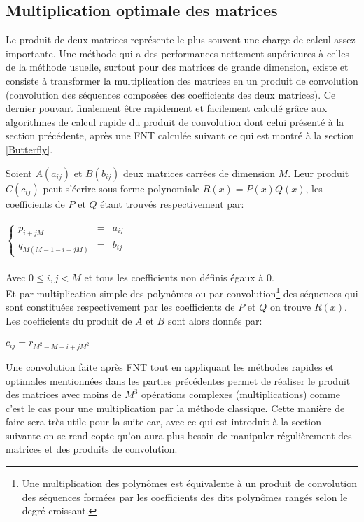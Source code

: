 \subsection{Multiplication optimale des matrices \cite{Matrices}}
Le produit de deux matrices représente le plus souvent une charge de calcul assez importante. Une méthode qui a des performances nettement supérieures à celles de la méthode usuelle, surtout pour des matrices de grande dimension, existe et consiste à transformer la multiplication des matrices en un produit de convolution (convolution des séquences composées des coefficients des deux matrices). Ce dernier pouvant finalement être rapidement et facilement calculé grâce aux algorithmes de calcul rapide du produit de convolution dont celui présenté à la section précédente, après une FNT calculée suivant ce qui est montré à la section \ref{Butterfly}.
\begin{algorithm}\label{MultiplicationMatrices}
Soient $ A(a_{ij}) $ et $ B(b_{ij}) $ deux matrices carrées de dimension $ M $. Leur produit $ C(c_{ij}) $ peut s'écrire sous forme polynomiale $ R(x) = P(x)Q(x) $, les coefficients de $ P $ et $ Q $ étant trouvés respectivement par:\\
 \\
$ \left\{\begin{array}{lcl}
p_{i+jM} &=& a_{ij}\\
q_{M(M-1-i+jM)} &=& b_{ij}
\end{array}\right. $  \\
 \\
Avec $ 0\leq i,j<M $ et tous les coefficients non définis égaux à $ 0 $.\\
Et par multiplication simple des polynômes ou par convolution\footnote{Une multiplication des polynômes est équivalente à un produit de convolution des séquences formées par les coefficients des dits polynômes rangés selon le degré croissant.} des séquences qui sont constituées respectivement par les coefficients de $ P $ et $ Q $ on trouve $ R(x) $. Les coefficients du produit de $ A $ et $ B $ sont alors donnés par:\\
 \\
$ c_{ij} = r_{M^{2}-M+i+jM^{2}} $
\end{algorithm}
Une convolution faite après FNT tout en appliquant les méthodes rapides et optimales mentionnées dans les parties précédentes permet de réaliser le produit des matrices avec moins de $ M^{3} $ opérations complexes (multiplications) comme c'est le cas pour une multiplication par la méthode classique. Cette manière de faire sera très utile pour la suite car, avec ce qui est introduit à la section suivante on se rend copte qu'on aura plus besoin de manipuler régulièrement des matrices et des produits de convolution.
